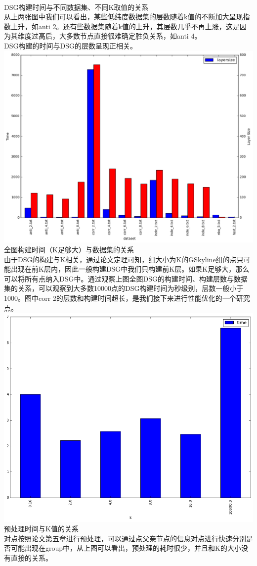\documentclass{article}
\begin{document}
\begin{CJK}{UTF8}{gbsn}
\\DSG构建时间与不同数据集、不同K取值的关系\\
从上两张图中我们可以看出，某些低纬度数据集的层数随着k值的不断加大呈现指数上升，如anti 2。还有些数据集随着k值的上升，其层数几乎不再上涨，这是因为其维度过高后，大多数节点直接很难确定胜负关系，如anti 4。\\
DSG构建的时间与DSG的层数呈现正相关。\\
\includegraphics[scale=0.4]{pics/max_layer_building_time.png}
\\
全图构建时间（K足够大）与数据集的关系\\
由于DSG的构建与K相关，通过论文定理可知，组大小为K的GSkyline组的点只可能出现在前K层内，因此一般构建DSG中我们只构建前K层。如果K足够大，那么可以将所有点纳入DSG中。通过观察上图全图DSG的构建时间、构建层数与数据集的关系，可以观察到大多数10000点的DSG构建时间为秒级别，层数一般小于1000。图中corr 2的层数和构建时间超长，是我们接下来进行性能优化的一个研究点。\\
\includegraphics[scale=0.4]{pics/prefilter.png}\\
预处理时间与K值的关系\\
对点按照论文第五章进行预处理，可以通过点父亲节点的信息对点进行快速分别是否可能出现在group中，从上图可以看出，预处理的耗时很少，并且和K的大小没有直接的关系。\\

\end{CJK}
\end{document}
